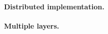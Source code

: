 \documentclass[a4paper,12pt,twoside]{report}
\begin{document}
\paragraph{Distributed implementation.}

\paragraph{Multiple layers.}



\end{document}
